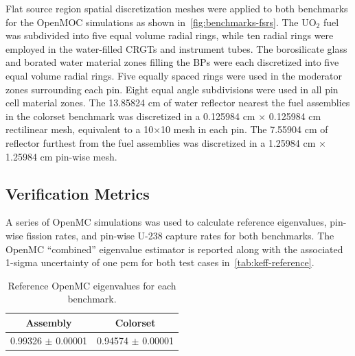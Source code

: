 
Flat source region spatial discretization meshes were applied to both benchmarks for the OpenMOC simulations as shown in~\autoref{fig:benchmarks-fsrs}. The UO$_2$ fuel was subdivided into five equal volume radial rings, while ten radial rings were employed in the water-filled CRGTs and instrument tubes. The borosilicate glass and borated water material zones filling the BPs were each discretized into five equal volume radial rings. Five equally spaced rings were used in the moderator zones surrounding each pin. Eight equal angle subdivisions were used in all pin cell material zones. The 13.85824 cm of water reflector nearest the fuel assemblies in the colorset benchmark was discretized in a 0.125984 cm $\times$ 0.125984 cm rectilinear mesh, equivalent to a 10$\times$10 mesh in each pin. The 7.55904 cm of reflector furthest from the fuel assemblies was discretized in a 1.25984 cm $\times$ 1.25984 cm pin-wise mesh.

\subsection{Verification Metrics}
\label{subsec:metrics}

A series of OpenMC simulations was used to calculate reference eigenvalues, pin-wise fission rates, and pin-wise U-238 capture rates for both benchmarks. The OpenMC ``combined'' eigenvalue estimator is reported along with the associated 1-sigma uncertainty of one pcm for both test cases in~\autoref{tab:keff-reference}.


\begin{table}[h!]
  \centering
  \caption{Reference OpenMC eigenvalues for each benchmark.}
  \label{tab:keff-reference} 
  \begin{tabular}{c c}
  \toprule
  {\bf Assembly} &
  {\bf Colorset} \\
  \midrule
  0.99326 $\pm$ 0.00001 & 0.94574 $\pm$ 0.00001 \\
  \bottomrule
\end{tabular}
\end{table}

